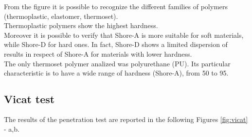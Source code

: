 \documentclass[a4paper, 11pt]{article}
\begin{document}
From the figure it is possible to recognize the different families of polymers (thermoplastic, elastomer, thermoset).\\
Thermoplastic polymers show the highest hardness.\\
Moreover it is possible to verify that Shore-A is more suitable for soft materials, while Shore-D for hard ones. In fact, Shore-D shows a limited dispersion of results in respect of Shore-A for materials with lower hardness.\\
The only thermoset polymer analized was polyurethane (PU). Its particular characteristic is to have a wide range of hardness (Shore-A), from 50 to 95.

\subsection{Vicat test}

The results of the penetration test are reported in the following Figures \ref{fig:vicat} - a,b.
\end{document}

